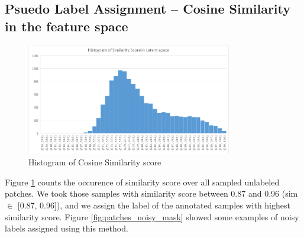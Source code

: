 \subsection{Psuedo Label Assignment -- Cosine Similarity in the feature space}
\begin{figure}[h]
	\centering
	\includegraphics[width=0.8\textwidth]{img/semi-experiment/cosine_sim_histogram}
	\caption{Histogram of Cosine Similarity score}
	\label{fig:score_hist}
\end{figure}

Figure \ref{fig:score_hist} counts the occurence of similarity score over all sampled unlabeled patches. We took those samples with similarity score between 0.87 and 0.96 (sim $\in$ [0.87, 0.96]), and we assign the label of the annotated samples with highest similarity score. Figure \ref{fig:patches_noisy_mask} showed some examples of noisy labels assigned using this method.\\

